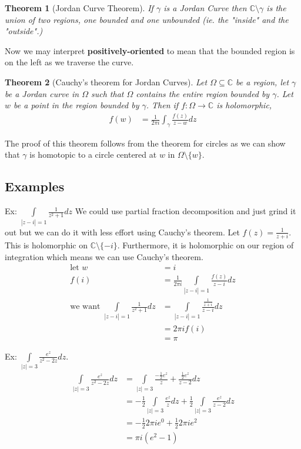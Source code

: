 \documentclass[a4paper, 11pt]{article}
\newtheorem*{theorem}{Theorem}
\begin{document}
	\begin{theorem}[Jordan Curve Theorem]
		If $\gamma$ is a Jordan Curve then $\mathbb{C}\setminus\gamma$ is the union of two regions, one bounded and one unbounded (ie. the "inside" and the "outside".)
	\end{theorem}	
	
	\noindent Now we may interpret \textbf{positively-oriented} to mean that the bounded region is on the left as we traverse the curve. \\
	
	\begin{theorem}[Cauchy's theorem for Jordan Curves]
		Let $\Omega\subseteq\mathbb{C}$ be a region, let $\gamma$ be a Jordan curve in $\Omega$ such that $\Omega$ contains the entire region bounded by $\gamma$. Let $w$ be a point in the region bounded by $\gamma$. Then if $f:\Omega\rightarrow\mathbb{C}$ is holomorphic, 
			\begin{align*}
				f(w) &= \frac{1}{2\pi i}\int_{\gamma} \frac{f(z)}{z-w}dz
			\end{align*}
	\end{theorem}
	
	\noindent The proof of this theorem follows from the theorem for circles as we can show that $\gamma$ is homotopic to a circle centered at $w$ in $\Omega\setminus\{w\}
	$. 
		
		
		
\subsection*{Examples}
		Ex: $\int\limits_{|z-i|=1} \frac{1}{z^2+1}dz$ We could use partial fraction decomposition and just grind it out but we can do it with less effort using Cauchy's theorem. Let $f(z)=\frac{1}{z+i}$. This is holomorphic on $\mathbb{C}\setminus\{-i\}$. Furthermore, it is holomorphic on our region of integration which means we can use Cauchy's theorem. 
			\begin{align*}
				\text{let } w&= i  \\ 
				f(i) &= \frac{1}{2\pi i}\int\limits_{|z-i|=1}\frac{f(z)}{z-i}dz \\ 
				\text{we want } \int\limits_{|z-i|=1}\frac{1}{z^2+1}dz &= \int\limits_{|z-i|=1}\frac{\frac{1}{z+i}}{z-i}dz \\ 
				&= 2\pi i f(i) \\
				&= \pi 
			\end{align*}
		
		\noindent Ex: $\int\limits_{|z|=3}\frac{e^z}{z^2-2z}dz$. 
			\begin{align*}
				\int\limits_{|z|=3}\frac{e^z}{z^2-2z}dz &= \int\limits_{|z|=3}\frac{-\frac{1}{2}e^z}{z}+\frac{\frac{1}{2}e^z}{z-2}dz\\
				&= -\frac{1}{2}\int\limits_{|z|=3}\frac{e^z}{z}dz +\frac{1}{2}\int\limits_{|z|=3} \frac{e^z}{z-2}dz \\ 
				&= -\frac{1}{2}2\pi i e^0 + \frac{1}{2}2\pi i e^2 \\ 
				&= \pi i(e^2-1)
			\end{align*}
		
		
		
		
		
		
		
		
		
		
		
		
		
		
		
		
		
		
		
		
	
\end{document}
